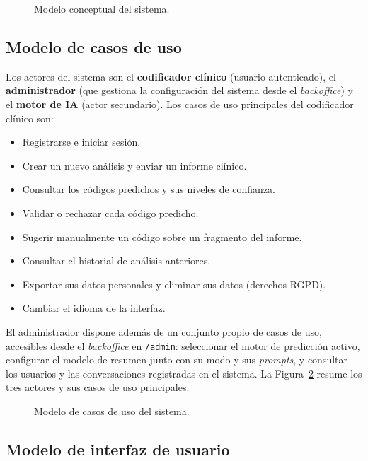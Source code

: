\begin{figure}[!htbp]
\centering
\resizebox{\textwidth}{!}{}
\caption{Modelo conceptual del sistema.}
\label{fig:modelo-conceptual}
\end{figure}

\subsection{Modelo de casos de uso}

Los actores del sistema son el \textbf{codificador clínico} (usuario autenticado), el \textbf{administrador} (que gestiona la configuración del sistema desde el \emph{backoffice}) y el \textbf{motor de IA} (actor secundario). Los casos de uso principales del codificador clínico son:

\begin{itemize}
 \item Registrarse e iniciar sesión.
 \item Crear un nuevo análisis y enviar un informe clínico.
 \item Consultar los códigos predichos y sus niveles de confianza.
 \item Validar o rechazar cada código predicho.
 \item Sugerir manualmente un código sobre un fragmento del informe.
 \item Consultar el historial de análisis anteriores.
 \item Exportar sus datos personales y eliminar sus datos (derechos RGPD).
 \item Cambiar el idioma de la interfaz.
\end{itemize}

El administrador dispone además de un conjunto propio de casos de uso, accesibles desde el \emph{backoffice} en \texttt{/admin}: seleccionar el motor de predicción activo, configurar el modelo de resumen junto con su modo y sus \emph{prompts}, y consultar los usuarios y las conversaciones registradas en el sistema. La Figura~\ref{fig:casos-uso} resume los tres actores y sus casos de uso principales.

\begin{figure}[!htbp]
\centering
\resizebox{0.8\textwidth}{!}{}
\caption{Modelo de casos de uso del sistema.}
\label{fig:casos-uso}
\end{figure}

\subsection{Modelo de interfaz de usuario}
\label{sec:modelo-interfaz}

